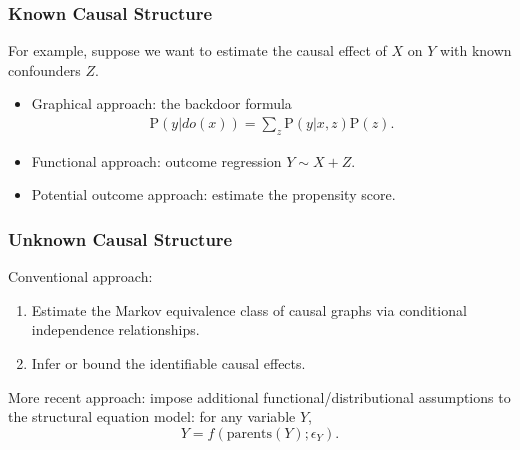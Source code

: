\documentclass{beamer}
\begin{document}
\begin{frame}
  \sectionpage
\end{frame}

\begin{frame}
  \frametitle{Known Causal Structure}
  \begin{center}
  \end{center}
  For example, suppose we want to estimate the causal effect of $X$ on $Y$ with
  known confounders $Z$.
  \begin{itemize}
  \item Graphical approach: the backdoor formula
    \vspace{-0.5em}
    \[
    \begin{split}
      \mathrm{P}(y|do(x)) = \sum_z \mathrm{P}(y|x, z) \mathrm{P}(z).
    \end{split}
    \]
    \vspace{-2em}
  \item Functional approach: outcome regression $Y \sim X + Z$.
  \item Potential outcome approach: estimate the propensity score.
  \end{itemize}
\end{frame}

\begin{frame}

  \frametitle{Unknown Causal Structure}
  Conventional approach:
  \begin{enumerate}
  \item Estimate the Markov equivalence class of causal graphs via conditional
    independence relationships.
  \item Infer or bound the identifiable causal effects.
  \end{enumerate}

  \vspace{1em}

  More recent approach: impose additional functional/distributional
  assumptions to the structural equation model: for any variable $Y$,
  \[
  Y = f(\mathrm{parents}(Y);\epsilon_Y).
  \]

\end{frame}
\end{document}
